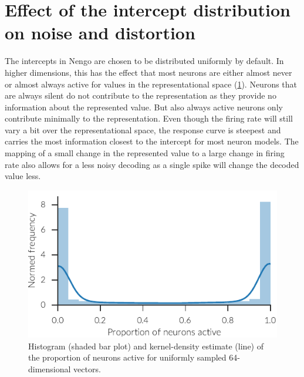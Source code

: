 \section{Effect of the intercept distribution on noise and distortion}
The intercepts in Nengo are chosen to be distributed uniformly by default.
In higher dimensions, this has the effect that most neurons are either almost never or almost always active for values in the representational space (\cref{fig:act-proportion}).
Neurons that are always silent do not contribute to the representation as they provide no information about the represented value.
But also always active neurons only contribute minimally to the representation.
Even though the firing rate will still vary a bit over the representational space, the response curve is steepest and carries the most information closest to the intercept for most neuron models.
The mapping of a small change in the represented value to a large change in firing rate also allows for a less noisy decoding as a single spike will change the decoded value less.
\begin{figure}
    \centering
    \includegraphics{figures/act-proportion}
    \caption[Distribution of the proportion of active neurons]{Histogram (shaded bar plot) and kernel-density estimate (line) of the proportion of neurons active for uniformly sampled 64-dimensional vectors.}\label{fig:act-proportion}
\end{figure}

